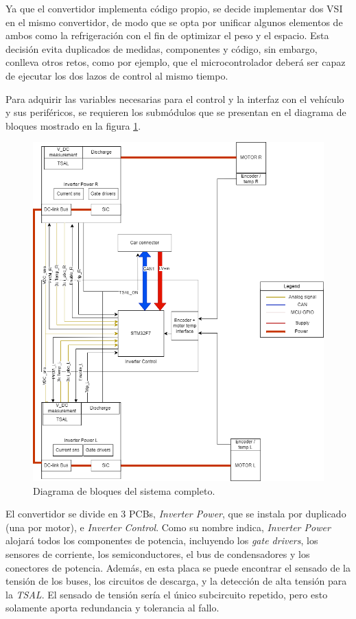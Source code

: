 Ya que el convertidor implementa código propio, se decide implementar dos VSI en el mismo convertidor, de modo que se opta por unificar algunos elementos de ambos como la refrigeración con el fin de optimizar el peso y el espacio. Esta decisión evita duplicados de medidas, componentes y código, sin embargo, conlleva otros retos, como por ejemplo, que el microcontrolador deberá ser capaz de ejecutar los dos lazos de control al mismo tiempo.

Para adquirir las variables necesarias para el control y la interfaz con el vehículo y sus periféricos, se requieren los submódulos que se presentan en el diagrama de bloques mostrado en la figura \ref{blocksHardware}.

\begin{figure}[H]
	\centering
	\includegraphics[width=0.7\linewidth]{fig/Inverter_HW}
	\caption{Diagrama de bloques del sistema completo.}
	\label{blocksHardware}
\end{figure}

El convertidor se divide en 3 PCBs, \textit{Inverter Power}, que se instala por duplicado (una por motor), e \textit{Inverter Control}. Como su nombre indica, \textit{Inverter Power} alojará todos los componentes de potencia, incluyendo los \textit{gate drivers}, los sensores de corriente, los semiconductores, el bus de condensadores y los conectores de potencia. Además, en esta placa se puede encontrar el sensado de la tensión de los buses, los circuitos de descarga, y la detección de alta tensión para la \textit{TSAL}. El sensado de tensión sería el único subcircuito repetido, pero esto solamente aporta redundancia y tolerancia al fallo.

